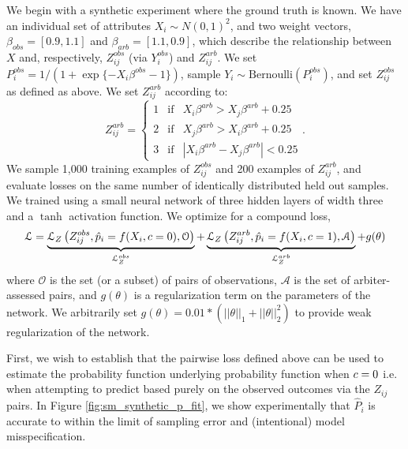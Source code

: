         We begin with a synthetic experiment where the ground truth is known.  We have an individual set of attributes $X_i \sim N(0, 1)^2$, and two weight vectors,  $\beta_{obs} = [0.9, 1.1]$ and $\beta_{arb} = [1.1, 0.9]$, which describe the relationship between $X$ and, respectively,  $Z_{ij}^{obs}$ (via $Y_{i}^{obs}$) and $Z_{ij}^{arb}$.  We set $P_i^{obs} = 1 / (1 + \exp\{-X_i \beta^{obs} - 1\})$, sample $Y_i \sim \mbox{Bernoulli}(P_i^{obs})$, and set $Z_{ij}^{obs}$ as defined as above.  We set $Z_{ij}^{arb}$ according to:
            $$ Z_{ij}^{arb} = \left\{ \begin{array}{lll}
                    1 & \mbox{if} & X_{i}\beta^{arb} > X_{j}\beta^{arb} + 0.25\\
                    2 & \mbox{if} & X_{j}\beta^{arb} > X_{i}\beta^{arb} + 0.25 \\
                    3 & \mbox{if} & | X_{i}\beta^{arb} - X_{j}\beta^{arb} | < 0.25
                \end{array} \right. .$$
        We sample 1,000 training examples of $Z_{ij}^{obs}$ and 200 examples of $Z_{ij}^{arb}$, and evaluate losses on the same number of identically distributed held out samples.  We trained using a small neural network of three hidden layers of width three and a $\tanh$ activation function. We optimize for a compound loss,
            $$\mathcal{L} = \underbrace{\mathcal{L}_Z\left(Z_{ij}^{obs}, \hat{p}_i = f(X_i, c = 0), \mathcal{O} \right)}_{\mathcal{L}_Z^{obs}}
                          + \underbrace{\mathcal{L}_Z\left(Z_{ij}^{arb}, \hat{p}_i = f(X_i, c = 1), \mathcal{A} \right)}_{\mathcal{L}_Z^{arb}} 
                          + g(\theta)$$
        where $\mathcal{O}$ is the set (or a subset) of pairs of observations, $\mathcal{A}$ is the set of arbiter-assessed pairs, and $g(\theta)$ is a regularization term on the parameters of the network.  We arbitrarily set $g(\theta) = 0.01 * \left(||\theta||_1 + ||\theta||_2^2\right)$ to provide weak regularization of the network.
        
        First, we wish to establish that the pairwise loss defined above can be used to estimate the probability function underlying probability function when $c = 0$ i.e. when attempting to predict based purely on the observed outcomes via the $Z_{ij}$ pairs.  In Figure \ref{fig:sm_synthetic_p_fit}, we show experimentally that $\hat{P}_i$ is accurate to within the limit of sampling error and (intentional) model misspecification.
        

